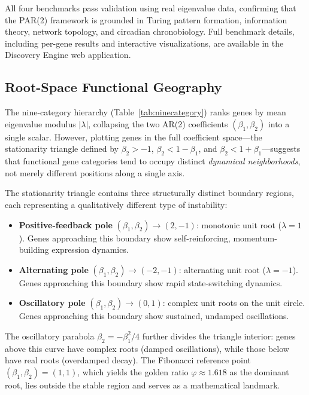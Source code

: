 \documentclass[11pt,letterpaper]{article}
\begin{document}
All four benchmarks pass validation using real eigenvalue data, confirming that the PAR(2) framework is grounded in Turing pattern formation, information theory, network topology, and circadian chronobiology. Full benchmark details, including per-gene results and interactive visualizations, are available in the Discovery Engine web application.

\subsection{Root-Space Functional Geography}

The nine-category hierarchy (Table~\ref{tab:ninecategory}) ranks genes by mean eigenvalue modulus $|\lambda|$, collapsing the two AR(2) coefficients $(\beta_1, \beta_2)$ into a single scalar. However, plotting genes in the full coefficient space---the stationarity triangle defined by $\beta_2 > -1$, $\beta_2 < 1 - \beta_1$, and $\beta_2 < 1 + \beta_1$---suggests that functional gene categories tend to occupy distinct \textit{dynamical neighborhoods}, not merely different positions along a single axis.

The stationarity triangle contains three structurally distinct boundary regions, each representing a qualitatively different type of instability:

\begin{itemize}[noitemsep]
    \item \textbf{Positive-feedback pole} $(\beta_1, \beta_2) \rightarrow (2, -1)$: monotonic unit root ($\lambda = 1$). Genes approaching this boundary show self-reinforcing, momentum-building expression dynamics.
    \item \textbf{Alternating pole} $(\beta_1, \beta_2) \rightarrow (-2, -1)$: alternating unit root ($\lambda = -1$). Genes approaching this boundary show rapid state-switching dynamics.
    \item \textbf{Oscillatory pole} $(\beta_1, \beta_2) \rightarrow (0, 1)$: complex unit roots on the unit circle. Genes approaching this boundary show sustained, undamped oscillations.
\end{itemize}

The oscillatory parabola $\beta_2 = -\beta_1^2/4$ further divides the triangle interior: genes above this curve have complex roots (damped oscillations), while those below have real roots (overdamped decay). The Fibonacci reference point $(\beta_1, \beta_2) = (1, 1)$, which yields the golden ratio $\varphi \approx 1.618$ as the dominant root, lies outside the stable region and serves as a mathematical landmark.
\end{document}
